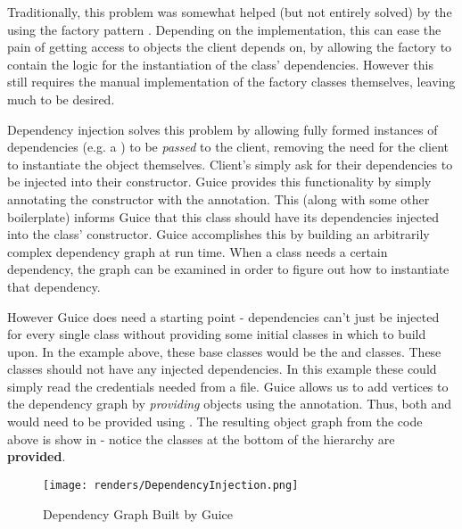 

Traditionally, this problem was somewhat helped (but not entirely solved) by the using the factory pattern \cite{factoryMethodPattern}. Depending on the implementation, this can ease the pain of getting access to objects the client depends on, by allowing the factory to contain the logic for the instantiation of the class' dependencies. However this still requires the manual implementation of the factory classes themselves, leaving much to be desired.


Dependency injection solves this problem by allowing fully formed instances of dependencies (e.g. a ) to be \textit{passed} to the client, removing the need for the client to instantiate the object themselves. Client's simply ask for their dependencies to be injected into their constructor. Guice provides this functionality by simply annotating the constructor with the  annotation. This (along with some other boilerplate) informs Guice that this class should have its dependencies injected into the class' constructor. Guice accomplishes this by building an arbitrarily complex dependency graph at run time. When a class needs a certain dependency, the graph can be examined in order to figure out how to instantiate that dependency. 

However Guice does need a starting point - dependencies can't just be injected for every single class without providing some initial classes in which to build upon. In the example above, these base classes would be the  and  classes. These classes should not have any injected dependencies. In this example these could simply read the credentials needed from a file. Guice allows us to add vertices to the dependency graph by \textit{providing} objects using the  annotation. Thus, both  and  would need to be provided using . The resulting object graph from the code above is show in  - notice the classes at the bottom of the hierarchy are \textbf{provided}. 

\begin{figure}[H]
      \centering
      \texttt{[image: renders/DependencyInjection.png]}
      \caption{Dependency Graph Built by Guice}
      \label{fig:depGraph}
\end{figure}

